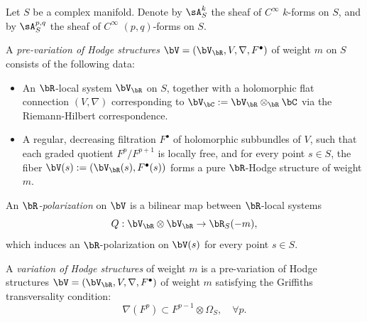 \documentclass[11pt,letterpaper]{amsart}
\numberwithin{equation}{section}
\begin{document}
	Let $S$ be a complex manifold. Denote by $\sA^k_S$ the sheaf of $C^\infty$ $k$-forms on $S$, and by $\sA^{p,q}_S$ the sheaf of $C^\infty$ $(p,q)$-forms on $S$.
	\begin{defn}  
		A \emph{pre-variation of Hodge structures} $\bV = (\bV_{\bR}, V, \nabla, F^\bullet)$ of weight $m$ on $S$ consists of the following data:  
		\begin{itemize}  
			\item An $\bR$-local system $\bV_{\bR}$ on $S$, together with a holomorphic flat connection $(V, \nabla)$ corresponding to $\bV_{\bC} := \bV_{\bR} \otimes_{\bR} \bC$ via the Riemann-Hilbert correspondence.  
			\item A regular, decreasing filtration $F^\bullet$ of holomorphic subbundles of $V$, such that each graded quotient $F^p / F^{p+1}$ is locally free, and for every point $s \in S$, the fiber $\bV(s) := (\bV_{\bR}(s), F^\bullet(s))$ forms a pure $\bR$-Hodge structure of weight $m$.  
		\end{itemize}  		
		An \emph{$\bR$-polarization} on $\bV$ is a bilinear map between $\bR$-local systems  
		$$ Q : \bV_{\bR} \otimes \bV_{\bR} \to \bR_S(-m), $$  
		which induces an $\bR$-polarization on $\bV(s)$ for every point $s \in S$.  
		
		A \emph{variation of Hodge structures} of weight $m$ is a pre-variation of Hodge structures $\bV = (\bV_{\bR}, V, \nabla, F^\bullet)$ of weight $m$ satisfying the Griffiths transversality condition:  
		$$ \nabla(F^p) \subset F^{p-1} \otimes \Omega_S, \quad \forall p. $$  
	\end{defn}
\end{document}
